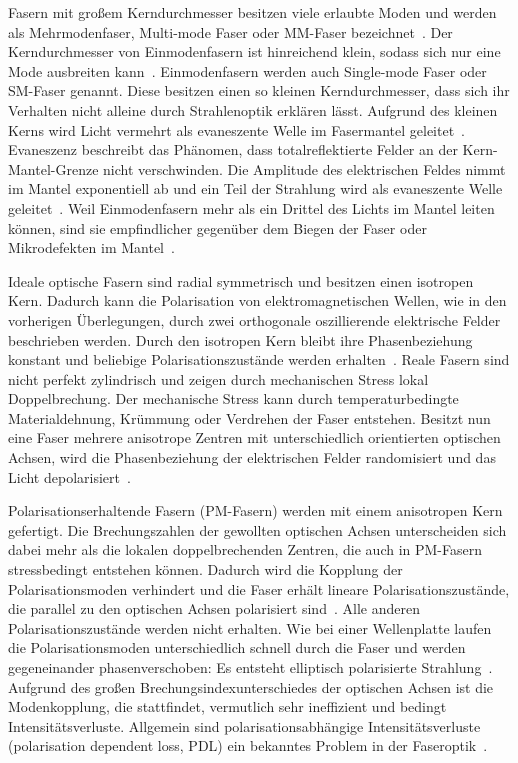 \documentclass[a4paper,12pt,twoside,parskip=no,headsepline,open=right,ngerman,export]{scrreprt}
\begin{document}
            Fasern mit großem Kerndurchmesser besitzen viele erlaubte Moden und werden als Mehrmodenfaser, Multi-mode Faser oder MM-Faser bezeichnet~\cite{pedrotti_optik_2005}. Der Kerndurchmesser von Einmodenfasern ist hinreichend klein, sodass sich nur eine Mode ausbreiten kann~\cite{pedrotti_optik_2005}. Einmodenfasern werden auch Single-mode Faser oder SM-Faser genannt. Diese besitzen einen so kleinen Kerndurchmesser, dass sich ihr Verhalten nicht alleine durch Strahlenoptik erklären lässt. Aufgrund des kleinen Kerns wird Licht vermehrt als evaneszente Welle im Fasermantel geleitet~\cite{pedrotti_optik_2005}. Evaneszenz beschreibt das Phänomen, dass totalreflektierte Felder an der Kern-Mantel-Grenze nicht verschwinden. Die Amplitude des elektrischen Feldes nimmt im Mantel exponentiell ab und ein Teil der Strahlung wird als evaneszente Welle geleitet~\cite{pedrotti_optik_2005}. Weil Einmodenfasern mehr als ein Drittel des Lichts im Mantel leiten können, sind sie empfindlicher gegenüber dem Biegen der Faser oder Mikrodefekten im Mantel~\cite{pedrotti_optik_2005}. 
            
            Ideale optische Fasern sind radial symmetrisch und besitzen einen isotropen Kern. Dadurch kann die Polarisation von elektromagnetischen Wellen, wie in den vorherigen Überlegungen, durch zwei orthogonale oszillierende elektrische Felder beschrieben werden. Durch den isotropen Kern bleibt ihre Phasenbeziehung konstant und beliebige Polarisationszustände werden erhalten~\cite{ma_characterization_2009}. Reale Fasern sind nicht perfekt zylindrisch und zeigen durch mechanischen Stress lokal Doppelbrechung. Der mechanische Stress kann durch temperaturbedingte Materialdehnung, Krümmung oder Verdrehen der Faser entstehen. Besitzt nun eine Faser mehrere anisotrope Zentren mit unterschiedlich orientierten optischen Achsen, wird die Phasenbeziehung der elektrischen Felder randomisiert und das Licht depolarisiert~\cite{ma_characterization_2009}.
            
            Polarisationserhaltende Fasern (PM-Fasern) werden mit einem anisotropen Kern gefertigt. Die Brechungszahlen der gewollten optischen Achsen unterscheiden sich dabei mehr als die lokalen doppelbrechenden Zentren, die auch in PM-Fasern stressbedingt entstehen können. Dadurch wird die Kopplung der Polarisationsmoden verhindert und die Faser erhält lineare Polarisationszustände, die parallel zu den optischen Achsen polarisiert sind~\cite{ma_characterization_2009}. Alle anderen Polarisationszustände werden nicht erhalten. Wie bei einer Wellenplatte laufen die Polarisationsmoden unterschiedlich schnell durch die Faser und werden gegeneinander phasenverschoben: Es entsteht elliptisch polarisierte Strahlung~\cite{ma_characterization_2009}. Aufgrund des großen Brechungsindexunterschiedes der optischen Achsen ist die Modenkopplung, die stattfindet, vermutlich sehr ineffizient und bedingt Intensitätsverluste. Allgemein sind polarisationsabhängige Intensitätsverluste (polarisation dependent loss, PDL) ein bekanntes Problem in der Faseroptik~\cite{ping_lu_statistical_2001, mecozzi_statistics_2002}.
            
\end{document}
